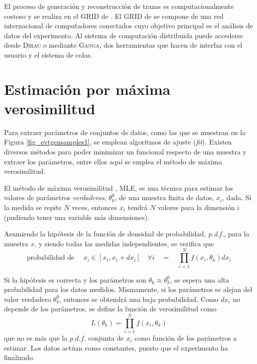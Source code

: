 El proceso de generación y reconstrucción de trazas es computacionalmente costoso y se realiza en el GRID de \lhcb. 
El GRID de \lhcb se compone de una red internacional de computadores conectados cuyo objetivo principal es el análisis de datos del experimento. Al sistema de computación distribuida puede accederse desde \textsc{Dirac} o mediante \textsc{Ganga}, dos herramientas que hacen de interfaz con el usuario y el sistema de colas.










\section{Estimación por máxima verosimilitud}


Para extraer parámetros de conjuntos de datos, como las que se muestran en la Figura \ref{fig_evtgensamples1}, se emplean algoritmos de ajuste (\emph{fit}). Existen diversos métodos para poder minimizar un funcional respecto de una muestra y extraer los parámetros, entre ellos aquí se emplea el método de máxima verosimilitud.

El método de máxima verosimilitud \cite{cowan}, MLE, es una técnica para estimar los valores de parámetros \emph{verdaderos}, $\theta_k^0$, de una muestra finita de datos, $x_i$, dada. Si la medida se repite $N$ veces, entonces $x_i$ tendrá $N$ valores para la dimensión $i$ (pudiendo tener una variable más dimensiones).



Asumiendo la hipótesis de la función de densidad de probabilidad, \emph{p.d.f.}, para la muestra $x$, y siendo todas las medidas independientes, se verifica que
\begin{equation}
\text{probabilidad de } \quad x_i \in [x_i, x_i+dx_i] \quad \forall i \quad  = \quad \prod_{i=1}^N f(x_i,\theta_k) dx_i	
\end{equation}




Si la hipótesis es correcta y los parámetros son $\theta_k \approx \theta_k^0$, se espera una alta probabilidad para los datos medidos. Mismamente, si los parámetros se alejan del valor verdadero $\theta_k^0$, entonces se obtendrá una baja probabilidad.
Como  $dx_i$ no depende de los parámetros, se define la función de verosimilitud como
\begin{equation}
	L(\theta_k) = \prod_{i=1}^N f(x_i,\theta_k) \label{eq_likelihood_def}
\end{equation}  
que no es más que la \color{dieg} $p.d.f.$ conjunta de $x_i$ como función de los parámetros a estimar. \color{norm} Los datos actúan como constantes, puesto que el experimento ha finalizado.


